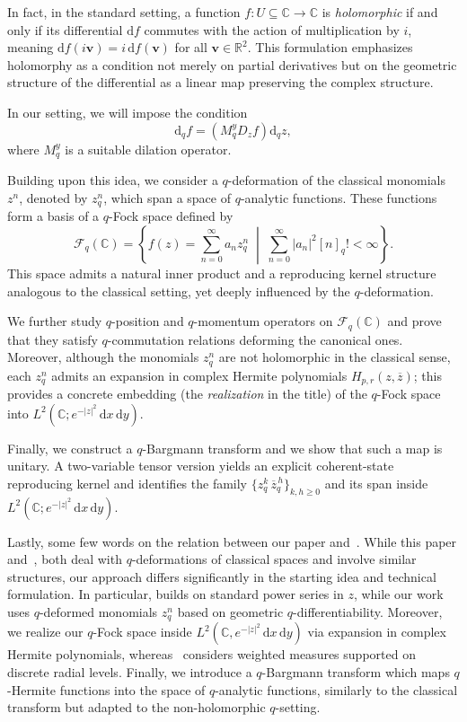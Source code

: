 \documentclass[10pt]{amsart}
\theoremstyle{plain}
\theoremstyle{definition}
\renewcommand{\bar}[1]{\overline{#1}}
\def\ge{\geqslant}
\begin{document}
In fact, in the standard setting, a function $ f : U \subseteq \mathbb{C} \to \mathbb{C} $ is \textit{holomorphic} if and only if its differential $ \mathrm{d}f $ commutes with the action of multiplication by $ i $, meaning $ \mathrm{d}f(i\mathbf{v}) = i\,\mathrm{d}f(\mathbf{v}) $ for all $ \mathbf{v} \in \mathbb{R}^2 $. This formulation emphasizes holomorphy as a condition not merely on partial derivatives but on the geometric structure of the differential as a linear map preserving the complex structure.

In our setting, we will impose the condition
\[
\mathrm{d}_q f = \left( M_q^y D_z f \right) \mathrm{d}_q z,
\]
where $M_q^y$ is a suitable dilation operator.



Building upon this idea, we consider a $q$-deformation of the classical monomials $z^n$, denoted by $z_q^n$, which span a space of $q$-analytic functions. These functions form a basis of a $q$-Fock space defined by
\[
\mathcal{F}_q(\mathbb{C}) = \left\{ f(z) = \sum_{n=0}^\infty a_n z_q^n \;\middle|\; \sum_{n=0}^\infty |a_n|^2 [n]_q! < \infty \right\}.
\]
This space admits a natural inner product and a reproducing kernel structure analogous to the classical setting, yet deeply influenced by the $q$-deformation.

We further study $q$-position and $q$-momentum operators on $\mathcal{F}_q(\mathbb{C})$ and prove that they satisfy $q$-commutation relations deforming the canonical ones. Moreover, although the monomials $z_q^n$ are not holomorphic in the classical sense, each $z_q^n$ admits an expansion in complex Hermite polynomials $H_{p,r}(z,\bar z)$; this provides a concrete embedding (the \textit{realization} in the title) of the $q$-Fock space into $L^2(\mathbb{C}; e^{-|z|^2}\,\mathrm{d}x\,\mathrm{d}y)$.

Finally, we construct a $q$-Bargmann transform and we show that such a map is unitary. A two-variable tensor version yields an explicit coherent-state reproducing kernel and identifies the family $\{z_q^k\,\bar z_q^{\,h}\}_{k,h\ge0}$ and its span inside $L^2(\mathbb{C}; e^{-|z|^2}\,\mathrm{d}x\,\mathrm{d}y)$.

Lastly, some few words on the relation between our paper and~\cite{ACKS}.
While this paper and~\cite{ACKS}, both deal with $q$-deformations of classical spaces and involve similar structures, our approach differs significantly in the starting idea and technical formulation. In particular, \cite{ACKS} builds on standard power series in $z$, while our work uses $q$-deformed monomials $z_q^n$ based on geometric $q$-differentiability.
Moreover, we realize our $q$-Fock space inside $L^2(\mathbb{C}, e^{-|z|^2}\,\mathrm{d}x\,\mathrm{d}y)$ via expansion in complex Hermite polynomials, whereas~\cite{ACKS} considers weighted measures supported on discrete radial levels.
Finally, we introduce a $q$-Bargmann transform which maps $q$-Hermite functions into the space of $q$-analytic functions, similarly to the classical transform but adapted to the non-holomorphic $q$-setting.
\end{document}
